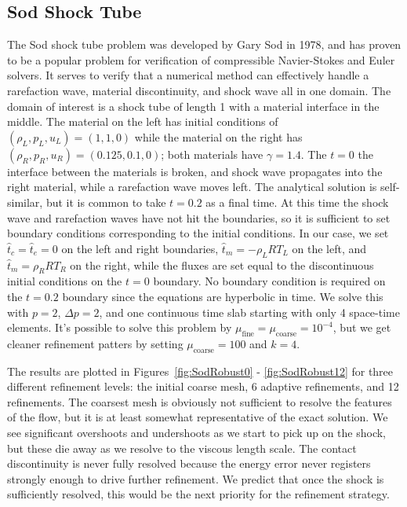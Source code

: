\documentclass[Dissertation.tex]{subfiles}
\begin{document}
\subsection{Sod Shock Tube}
The Sod shock tube problem was developed by Gary Sod in 1978\cite{Sod1978}, and has proven to be a popular problem for verification 
of compressible Navier-Stokes and Euler solvers.
It serves to verify that a numerical method can effectively handle a rarefaction wave, material discontinuity, and shock wave
all in one domain.
The domain of interest is a shock tube of length 1 with a material interface in the middle. The material on the left has initial conditions of 
$(\rho_L,p_L,u_L)=(1,1,0)$ while the material on the right has $(\rho_R,p_R,u_R)=(0.125,0.1,0)$; both materials have $\gamma=1.4$. 
The $t=0$ the interface between the materials is broken, 
and shock wave propagates into the right material, while a rarefaction wave moves left. The analytical solution is self-similar, but it is common to take
$t=0.2$ as a final time.
At this time the shock wave and rarefaction waves have not hit the boundaries, 
so it is sufficient to set boundary conditions corresponding to the initial conditions.
In our case, we set $\hat t_c=\hat t_e=0$ on the left and right boundaries,
$\hat t_m=-\rho_LRT_L$ on the left, and $\hat t_m=\rho_RRT_R$ on the right,
while the fluxes are set equal to the discontinuous initial conditions on the $t=0$ boundary. 
No boundary condition is required on the $t=0.2$ boundary since the equations are hyperbolic in time.
We solve this with $p=2$, $\Delta p=2$, and one continuous time slab starting with only 4 space-time elements.
It's possible to solve this problem by $\mu_\text{fine}=\mu_\text{coarse}=10^{-4}$, 
but we get cleaner refinement patters by setting $\mu_\text{coarse}=100$ and $k=4$.

The results are plotted in Figures~\ref{fig:SodRobust0} - \ref{fig:SodRobust12} for three different refinement levels: the initial coarse mesh, 6 adaptive refinements, and 12 refinements.
The coarsest mesh is obviously not sufficient to resolve the features of the flow, but it is at least somewhat representative of the exact solution.
We see significant overshoots and undershoots as we start to pick up on the shock, but these die away as we resolve to the viscous length scale.
The contact discontinuity is never fully resolved because the energy error never registers
strongly enough to drive further refinement. 
We predict that once the shock is sufficiently resolved,
this would be the next priority for the refinement strategy.
\end{document}
